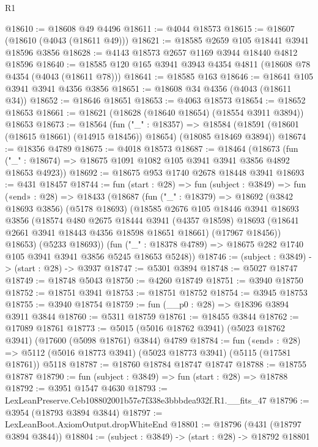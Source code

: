 \begin{lexlean}{R1}
\begin{coremodule}
@18610 := @18608 @49 @4496
@18611 := @4044 @18573
@18615 := @18607 (@18610 (@4043 (@18611 @49)))
@18621 := @18585 @2659 @105 @18441 @3941 @18596 @3856
@18628 := @4143 @18573 @2657 @1169 @3944 @18440 @4812 @18596
@18640 := @18585 @120 @165 @3941 @3943 @4354 @4811 (@18608 @78 @4354 (@4043 (@18611 @78)))
@18641 := @18585 @163
@18646 := @18641 @105 @3941 @3941 @4356 @3856
@18651 := @18608 @34 @4356 (@4043 (@18611 @34))
@18652 := @18646 @18651
@18653 := @4063 @18573
@18654 := @18652 @18653
@18661 := @18621 (@18628 (@18640 @18654) (@18554 @3911 @3894)) @18653
@18673 := @18564
    (fun ("_" : @18357) =>
    @18584 (@18591 (@18601 (@18615 @18661) (@14915 @18456)) @18654) (@18085 @18469 @3894))
@18674 := @18356 @4789
@18675 := @4018 @18573
@18687 := @18464
    (@18673 (fun ("_" : @18674) => @18675 @1091 @1082 @105 @3941 @3941 @3856 @4892 @18653 @4923))
@18692 := @18675 @953 @1740 @2678 @18448 @3941
@18693 := @431 @18457
@18744 := fun (start : @28) =>
  fun (subject : @3849) =>
  fun («end» : @28) =>
  @18433
    (@18687
      (fun ("_" : @18379) =>
      @18692
        (@3842 @18693 @3856)
        (@5178 @18693)
        (@18585
          @2676
          @105
          @18446
          @3941
          @18693
          @3856
          (@18574
            @480
            @2675
            @18444
            @3941
            (@4357 @18598)
            @18693
            (@18641 @2661 @3941 @18443 @4356 @18598 @18651 @18661)
            (@17967 @18456))
          @18653)
        (@5233 @18693))
      (fun ("_" : @18378 @4789) => @18675 @282 @1740 @105 @3941 @3941 @3856 @5245 @18653 @5248))
@18746 := (subject : @3849) -> (start : @28) -> @3937
@18747 := @5301 @3894
@18748 := @5027 @18747
@18749 := @18748 @5043
@18750 := @4260 @18749
@18751 := @3940 @18750
@18752 := @18751 @3941
@18753 := @18751 @18752
@18754 := @3945 @18753
@18755 := @3940 @18754
@18759 := fun (__p0 : @28) => @18396 @3894 @3911 @3844
@18760 := @5311 @18759
@18761 := @18455 @3844
@18762 := @17089 @18761
@18773 := @5015 (@5016 @18762 @3941) (@5023 @18762 @3941) (@17600 (@5098 @18761) @3844) @4789
@18784 := fun («end» : @28) =>
  @5112 (@5016 @18773 @3941) (@5023 @18773 @3941) (@5115 (@17581 @18761)) @5118
@18787 := @18760 @18784 @18747 @18747
@18788 := @18755 @18787
@18790 := fun (subject : @3849) => fun (start : @28) => @18788
@18792 := @3951 @1547 @4630
@18793 := LexLeanPreserve.Ceb108802001b57e7f338e3bbbdea932f.R1.__fits_47
@18796 := @3954 (@18793 @3894 @3844)
@18797 := LexLeanBoot.AxiomOutput.dropWhiteEnd
@18801 := @18796 (@431 (@18797 @3894 @3844))
@18804 := (subject : @3849) -> (start : @28) -> @18792 @18801

\end{coremodule}
\end{lexlean}
